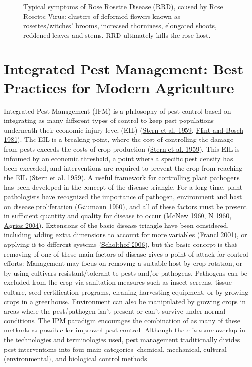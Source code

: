 \documentclass[12pt,final,CPage]{ufthesis}
\begin{document}
{\begin{figure}
{  }

  \caption[Typical symptoms of Rose Rosette Disease (RRD), caused by Rose Rosette Virus]{Typical symptoms of Rose Rosette Disease (RRD), caused by Rose Rosette Virus: clusters of deformed flowers known as rosettes/witches' brooms, increased thorniness, elongated shoots, reddened leaves and stems. RRD ultimately kills the rose host.}\label{fig:rrd-symptoms}
  \end{figure}
  \hypertarget{litrev-ipm}{%
  \section{Integrated Pest Management: Best Practices for Modern Agriculture}\label{litrev-ipm}}

  Integrated Pest Management (IPM) is a philosophy of pest control based on integrating as many different types of control to keep pest populations underneath their economic injury level (EIL) (\protect\hyperlink{ref-Stern1959}{Stern et al. 1959}, \protect\hyperlink{ref-Flint1981}{Flint and Bosch 1981}). The EIL is a breaking point, where the cost of controlling the damage from pests exceeds the costs of crop production (\protect\hyperlink{ref-Stern1959}{Stern et al. 1959}). This EIL is informed by an economic threshold, a point where a specific pest density has been exceeded, and interventions are required to prevent the crop from reaching the EIL (\protect\hyperlink{ref-Stern1959}{Stern et al. 1959}). A useful framework for controlling plant pathogens has been developed in the concept of the disease triangle. For a long time, plant pathologists have recognized the importance of pathogen, environment and host on disease proliferation (\protect\hyperlink{ref-Gaeumann1950}{Gäumann 1950}), and all of these factors must be present in sufficient quantity and quality for disease to occur (\protect\hyperlink{ref-McNew1960}{McNew 1960}, \protect\hyperlink{ref-Stevens1960}{N 1960}, \protect\hyperlink{ref-Agrios2004}{Agrios 2004}). Extensions of the basic disease triangle have been considered, including adding extra dimensions to account for more variables (\protect\hyperlink{ref-Francl2001}{Francl 2001}), or applying it to different systems (\protect\hyperlink{ref-Scholthof2006}{Scholthof 2006}), but the basic concept is that removing of one of these main factors of disease gives a point of attack for control efforts: Management may focus on removing a suitable host by crop rotation, or by using cultivars resistant/tolerant to pests and/or pathogens. Pathogens can be excluded from the crop via sanitation measures such as insect screens, tissue culture, seed certification programs, cleaning harvesting equipment, or by growing crops in a greenhouse. Environment can also be manipulated by growing crops in areas where the pest/pathogen isn't present or can't survive under normal conditions. The IPM paradigm encourages the combination of as many of these methods as possible for improved pest control. Although there is some overlap in the technologies and terminologies used, pest management traditionally divides pest interventions into four main categories: chemical, mechanical, cultural (environmental), and biological control methods }
\end{document}
